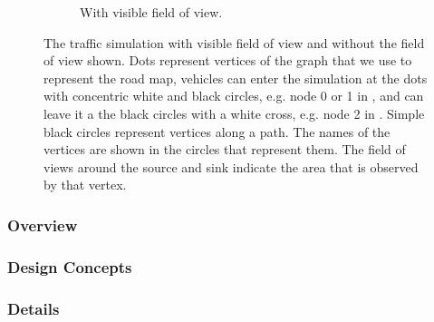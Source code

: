 \begin{figure}
\begin{subfigure}{0.49\textwidth}
		\caption{With visible field of view.}
		\label{fig:model:simulation:fix}
	\end{subfigure}	
	\caption{The traffic simulation with  visible field of view and  without the field of view shown. Dots represent vertices of the graph that we use to represent the road map, vehicles can enter the simulation at the dots with concentric white and black circles, e.g. node 0 or 1 in , and can leave it a the black circles with a white cross, e.g. node 2 in . Simple black circles represent vertices along a path. The names of the vertices are shown in the circles that represent them. The field of views around the source and sink indicate the area that is observed by that vertex.}
	\label{fig:model:simulation}
\end{figure}

\subsubsection{Overview}
\label{subsub:method:model:overview}


\subsubsection{Design Concepts}
\label{subsub:method:model:design}


\subsubsection{Details}
\label{subsub:method:model:details}
